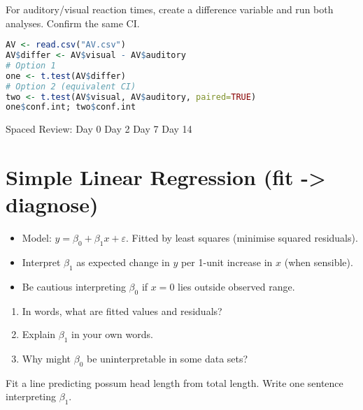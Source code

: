 \documentclass[11pt,a4paper]{article}
\def\textbf#1{#1}%
\newcommand{\reviewticks}{
  \vspace{0.4em}
  \noindent\scriptsize\textbf{Spaced Review:}
  \fbox{\phantom{D0}} Day 0\quad
  \fbox{\phantom{D2}} Day 2\quad
  \fbox{\phantom{D7}} Day 7\quad
  \fbox{\phantom{D14}} Day 14
}
\begin{document}
\begin{practicebox}
For auditory/visual reaction times, create a difference variable and run both analyses. Confirm the same CI.
\end{practicebox}

\begin{rbox}
\begin{lstlisting}[language=R]
AV <- read.csv("AV.csv")
AV$differ <- AV$visual - AV$auditory
# Option 1
one <- t.test(AV$differ)
# Option 2 (equivalent CI)
two <- t.test(AV$visual, AV$auditory, paired=TRUE)
one$conf.int; two$conf.int
\end{lstlisting}
\end{rbox}

\reviewticks

\section{Simple Linear Regression (fit -> diagnose)}

\begin{corebox}
\begin{itemize}
  \item Model: \( y = \beta_0 + \beta_1 x + \varepsilon \). Fitted by least squares (minimise squared residuals).
  \item Interpret \(\beta_1\) as expected change in \(y\) per 1-unit increase in \(x\) (when sensible).
  \item Be cautious interpreting \(\beta_0\) if \(x=0\) lies outside observed range.
\end{itemize}
\end{corebox}

\begin{recallbox}
\begin{enumerate}
  \item In words, what are fitted values and residuals?
  \item Explain \(\beta_1\) in your own words.
  \item Why might \(\beta_0\) be uninterpretable in some data sets?
\end{enumerate}
\end{recallbox}

\begin{practicebox}
Fit a line predicting possum head length from total length. Write one sentence interpreting \(\beta_1\).
\end{practicebox}
\end{document}
